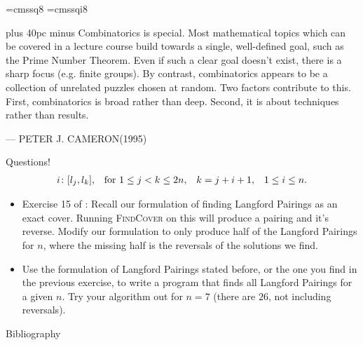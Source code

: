 \documentclass[aspectratio=169]{beamer}
\begin{document}
\font\eightss=cmssq8
\font\eightssi=cmssqi8
\newcommand\quoteAuthorDate[3]{\begingroup
  \baselineskip 10pt
  \parfillskip 0pt
  \interlinepenalty 10000 %
  \leftskip 0pt plus 40pc minus \parindent
  \let\rm=\eightss
  \let\sl=\eightssi
  \everypar{\sl}#1\par
  \nobreak\smallskip
  \noindent\rm--- #2\unskip\enspace(#3)\par
  \endgroup}
\begin{frame}
    \begin{center}
        \item \quoteAuthorDate{Combinatorics is special. Most mathematical topics which can be covered in a lecture course build towards a single, well-defined goal, such as the Prime Number Theorem. Even if such a clear goal doesn’t exist, there is a sharp focus (e.g. finite groups). By contrast, combinatorics appears to be a collection of unrelated puzzles chosen at random. Two factors contribute to this. First, combinatorics is broad rather than deep. Second, it is about techniques rather than results.}{PETER J. CAMERON}{\color{sigma@mainblue}1995}
    \end{center}
\end{frame}

\begin{frame}{Questions!}
    \begin{align*}
        i\colon \bqty{l_j, l_k}, & & \text{for } 1 \leq j < k \leq 2n, & & k = j + i + 1, & & 1 \leq i \leq n.
    \end{align*} \vspace{-25pt}
    \begin{itemize}
        \item \textcolor{sigma@alertred}{Exercise 15 of \cite[Chapter~7.2.2.1]{TAOCP4B}:} Recall our formulation of finding Langford Pairings as an exact cover. Running \textsc{FindCover} on this will produce a pairing and it's reverse. Modify our formulation to only produce half of the Langford Pairings for $n$, where the missing half is the reversals of the solutions we find. \vspace{10pt}
        \item Use the formulation of Langford Pairings stated before, or the one you find in the previous exercise, to write a program that finds all Langford Pairings for a given $n$. Try your algorithm out for $n = 7$ (there are $26$, not including reversals).
    \end{itemize}
    
\end{frame}

\begin{frame}{Bibliography}
    
    {\scriptsize }
\end{frame}
\end{document}
